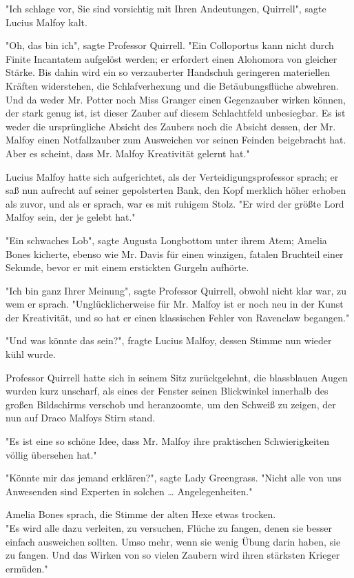 {"Ich schlage vor, Sie sind vorsichtig mit Ihren Andeutungen, Quirrell", sagte Lucius Malfoy kalt.

"Oh, das bin ich", sagte Professor Quirrell. "Ein Colloportus kann nicht durch Finite Incantatem aufgelöst werden; er erfordert einen Alohomora von gleicher Stärke. Bis dahin wird ein so verzauberter Handschuh geringeren materiellen Kräften widerstehen, die Schlafverhexung und die Betäubungsflüche abwehren. Und da weder Mr. Potter noch Miss Granger einen Gegenzauber wirken können, der stark genug ist, ist dieser Zauber auf diesem Schlachtfeld unbesiegbar. Es ist weder die ursprüngliche Absicht des Zaubers noch die Absicht dessen, der Mr. Malfoy einen Notfallzauber zum Ausweichen vor seinen Feinden beigebracht hat. Aber es scheint, dass Mr. Malfoy Kreativität gelernt hat."

Lucius Malfoy hatte sich aufgerichtet, als der Verteidigungsprofessor sprach; er saß nun aufrecht auf seiner gepolsterten Bank, den Kopf merklich höher erhoben als zuvor, und als er sprach, war es mit ruhigem Stolz. "Er wird der größte Lord Malfoy sein, der je gelebt hat."

"Ein schwaches Lob", sagte Augusta Longbottom unter ihrem Atem; Amelia Bones kicherte, ebenso wie Mr. Davis für einen winzigen, fatalen Bruchteil einer Sekunde, bevor er mit einem erstickten Gurgeln aufhörte.

"Ich bin ganz Ihrer Meinung", sagte Professor Quirrell, obwohl nicht klar war, zu wem er sprach. "Unglücklicherweise für Mr. Malfoy ist er noch neu in der Kunst der Kreativität, und so hat er einen klassischen Fehler von Ravenclaw begangen."

"Und was könnte das sein?", fragte Lucius Malfoy, dessen Stimme nun wieder kühl wurde.

Professor Quirrell hatte sich in seinem Sitz zurückgelehnt, die blassblauen Augen wurden kurz unscharf, als eines der Fenster seinen Blickwinkel innerhalb des großen Bildschirms verschob und heranzoomte, um den Schweiß zu zeigen, der nun auf Draco Malfoys Stirn stand.

"Es ist eine so schöne Idee, dass Mr. Malfoy ihre praktischen Schwierigkeiten völlig übersehen hat."

"Könnte mir das jemand erklären?", sagte Lady Greengrass. "Nicht alle von uns Anwesenden sind Experten in solchen … Angelegenheiten."

Amelia Bones sprach, die Stimme der alten Hexe etwas trocken.\\ "Es wird alle dazu verleiten, zu versuchen, Flüche zu fangen, denen sie besser einfach ausweichen sollten. Umso mehr, wenn sie wenig Übung darin haben, sie zu fangen. Und das Wirken von so vielen Zaubern wird ihren stärksten Krieger ermüden."

}
